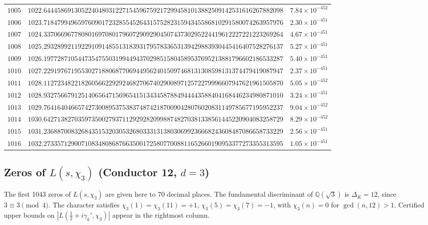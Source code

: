 \documentclass[12pt,reqno]{amsart}
\theoremstyle{remark}
\newcommand{\Q}{\mathbb{Q}}
\begin{document}
\begin{longtable}{clc}
$1005$ & $1022.6444586913052240480312271545967592172994581013882509142531616267882098$ & $7.84\times 10^{-452}$ \\
$1006$ & $1023.7184799496597609017232855452643157528231594345586810291580074263957976$ & $2.30\times 10^{-451}$ \\
$1007$ & $1024.3370669677808016970801796072909290450743730295224419612227221223269264$ & $4.67\times 10^{-451}$ \\
$1008$ & $1025.2932899211922910914855131839317957833653139429883930445416407528276137$ & $5.27\times 10^{-451}$ \\
$1009$ & $1026.1977287105447354755031994494370298515804589537695213881796602186533287$ & $5.40\times 10^{-451}$ \\
$1010$ & $1027.2291976719553027188068770694495624015097468131308598131374479419087947$ & $2.37\times 10^{-451}$ \\
$1011$ & $1028.1127234822182605662292924682706740290089712572279996607947621961505870$ & $5.05\times 10^{-452}$ \\
$1012$ & $1028.9327566791251406564715696541513434587884944443588404168446234980871010$ & $3.24\times 10^{-451}$ \\
$1013$ & $1029.7641640466574273008953753837487421870090428076020831149785677195952237$ & $9.04\times 10^{-452}$ \\
$1014$ & $1030.6427138270359735002793711292928209988748270381338561445220904083258729$ & $8.29\times 10^{-452}$ \\
$1015$ & $1031.2368870083268435153203053268033313138030699236668243608487086658733229$ & $2.56\times 10^{-451}$ \\
$1016$ & $1032.2733571290071083480868766350017258077008811652660190953377273355313595$ & $1.05\times 10^{-451}$ \\
\end{longtable}
\normalsize
\setlength{\LTleft}{0pt}
\setlength{\LTright}{0pt}

\subsection{Zeros of \texorpdfstring{$L(s,\chi_3)$}{L(s,chi3)} (Conductor 12, \texorpdfstring{$d = 3$}{d=3})}
\label{subsec:chi3}

The first 1043 zeros of $L(s,\chi_3)$ are given here to 70 decimal places.  The fundamental discriminant of $\Q(\sqrt{3})$ is $\Delta_K = 12$, since $3 \equiv 3 \pmod{4}$.  The character satisfies $\chi_3(1) = \chi_3(11) = +1$, $\chi_3(5) = \chi_3(7) = -1$, with $\chi_3(n) = 0$ for $\gcd(n,12) > 1$.  Certified upper bounds on $|L(\tfrac{1}{2}+i\gamma_k',\chi_3)|$ appear in the rightmost column.
\end{document}
